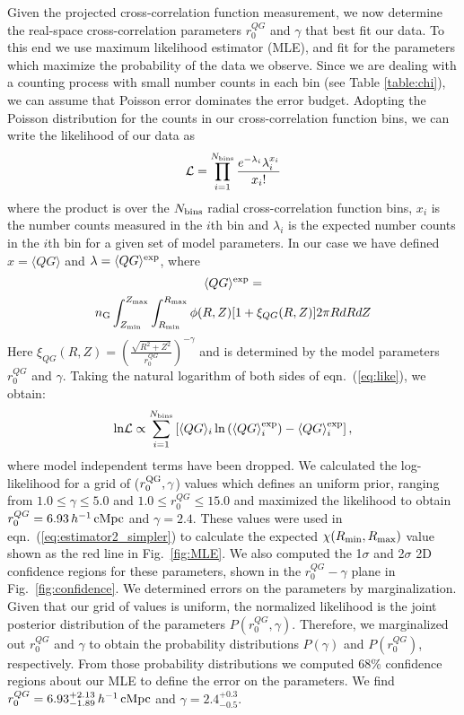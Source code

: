 \documentclass[iop, revtex4]{emulateapj}
\begin{document}
Given the projected cross-correlation
function measurement, we now determine the real-space cross-correlation parameters
$r_{0}^{QG}$ and $\gamma$ that best fit our data. To this end we use
maximum likelihood estimator (MLE), and fit for the parameters which maximize the
probability of the data we observe.  Since we are dealing with a counting
process with small number counts in each  bin (see Table \ref{table:chi}),
we can assume that Poisson error dominates the error budget. 
Adopting the Poisson distribution for the counts in our cross-correlation function bins,
we can write the likelihood of our data as
\begin{equation}
\mathcal{L} = \prod_{i=1}^{N_{\rm bins}}\frac{e^{-\lambda_{i}}\lambda_{i}^{x_{i}}}{x_{i}!}
\label{eq:like}
\end{equation}
where the product is over the $N_{\rm bins}$ radial cross-correlation function
bins, $x_{i}$ is the number counts measured in the $i$th bin and
$\lambda_{i}$ is the expected number counts in the $i$th bin for a
given set of model parameters. In our case we have defined $x =\langle
QG\rangle$ and $\lambda=\langle QG\rangle^{\rm exp}$, where
\begin{multline} 
	\langle QG\rangle^{\rm exp} =  \\  
	 n_{\rm G} \int_{Z_{\rm min}}^{Z_{\rm max}} \int_{R_{\rm min}}^{R_{\rm max}} \phi(R,Z)[1+\xi_{QG} (R,Z)] 2\pi R dR dZ  
	 \label{eq:NLBG1b} 
\end{multline}
Here $\xi_{QG} (R,Z)= \left( \frac{\sqrt{R^{2} + Z^{2}}}{r^{QG}_{0}} \right)^{-\gamma}$
and is determined by the
 model parameters $r_{0}^{QG}$
and $\gamma$. 
Taking the
natural logarithm of both sides of eqn.~(\ref{eq:like}), we
obtain:
\begin{equation}
{\rm ln} \mathcal{L} \propto  \sum_{i=1}^{N_{\rm bins}} \left[ \langle QG\rangle_{i}\, {\rm ln} \left(\langle QG\rangle_{i}^{\rm exp}\right)-\langle QG\rangle_{i}^{\rm exp} \right], 
\label{eq:lnlike_my} 
\end{equation}
where model independent terms have been dropped. We calculated the
log-likelihood for a grid of ($r^{\rm QG}_{0}, \gamma$) values which defines an uniform prior, ranging from
$1.0 \leq \gamma \leq 5.0$ and $1.0 \leq r^{QG}_{0}
\leq 15.0$ and maximized the likelihood to obtain
$r^{QG}_{0}=6.93 \,h^{-1}\,{\rm cMpc}$ and
$\gamma=2.4$. These values were used in eqn.~(\ref{eq:estimator2_simpler}) to
calculate the expected $\chi (R_{\rm min}, R_{\rm max})$ value shown as the
red line in Fig.~\ref{fig:MLE}.
We also computed the 1$\sigma$ and 2$\sigma$ 2D confidence regions for these parameters, 
shown in the $r^{QG}_{0}-\gamma$ plane in Fig.~\ref{fig:confidence}. 
We determined errors on the parameters by marginalization.  Given that our grid of values is uniform, the normalized likelihood is the joint
posterior distribution of the parameters $P(r^{QG}_{0}, \gamma)$.
Therefore, we marginalized out $r^{QG}_{0}$ and $\gamma$ to obtain the probability distributions
$P(\gamma)$ and $P(r^{QG}_{0})$, respectively.
From those probability distributions we computed 68\% confidence regions about our MLE to define the error on
the parameters. 
We find $r^{QG}_{0}=6.93^{+2.13}_{-1.89} \,h^{-1}\,{\rm cMpc}$ and $\gamma=2.4^{+0.3}_{-0.5}$.
\end{document}
